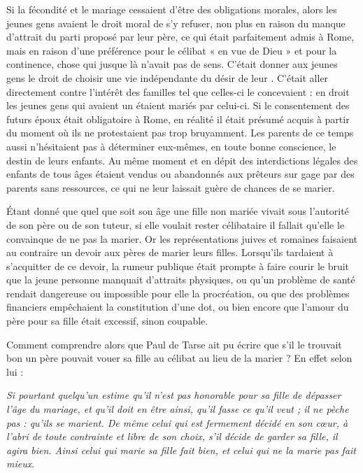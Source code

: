 Si la fécondité et le mariage cessaient d'être des obligations morales, alors les jeunes gens avaient le droit moral de s'y refuser, non plus en raison du manque d'attrait du parti proposé par leur père, ce qui était parfaitement admis à Rome, mais en raison d'une préférence pour le célibat « en vue de Dieu » et pour la continence, chose qui jusque là n'avait pas de sens. C'était donner aux jeunes gens le droit de choisir une vie indépendante du désir de leur . C'était aller directement contre l'intérêt des familles tel que celles-ci le concevaient : en droit les jeunes gens qui avaient un  étaient mariés par celui-ci. Si le consentement des futurs époux était obligatoire à Rome, en réalité il était présumé acquis à partir du moment où ils ne protestaient pas trop bruyamment. Les parents de ce temps aussi n'hésitaient pas à déterminer eux-mêmes, en toute bonne conscience, le destin de leurs enfants. Au même moment et en dépit des interdictions légales des enfants de tous âges étaient vendus ou abandonnés aux prêteurs sur gage par des parents sans ressources, ce qui ne leur laissait guère de chances de se marier.

 Étant donné que quel que soit son âge une fille non mariée vivait sous l'autorité de son père ou de son tuteur, si elle voulait rester célibataire il fallait qu'elle le convainque de ne pas la marier. Or les représentations juives et romaines faisaient au contraire un devoir aux pères de marier leurs filles. Lorsqu'ils tardaient à s'acquitter de ce devoir, la rumeur publique était prompte à faire courir le bruit que la jeune personne manquait d'attraits physiques, ou qu'un problème de santé rendait dangereuse ou impossible pour elle la procréation, ou que des problèmes financiers empêchaient la constitution d'une dot, ou bien encore que l'amour du père pour sa fille était excessif, sinon coupable. 

 Comment comprendre alors que Paul de Tarse ait pu écrire que s'il le trouvait bon un père pouvait vouer sa fille au célibat au lieu de la marier ? En effet selon lui :

\begin{displayquote}[I~Cor~7,~36-38]
\emph{Si pourtant quelqu'un estime qu'il n'est pas honorable pour sa fille de dépasser l'âge du mariage, et qu'il doit en être ainsi, qu'il fasse ce qu'il veut ; il ne pèche pas : qu'ils se marient. De même celui qui est fermement décidé en son cœur, à l'abri de toute contrainte et libre de son choix, s'il décide de garder sa fille, il agira bien. Ainsi celui qui marie sa fille fait bien, et celui qui ne la marie pas fait mieux}.
\end{displayquote}

